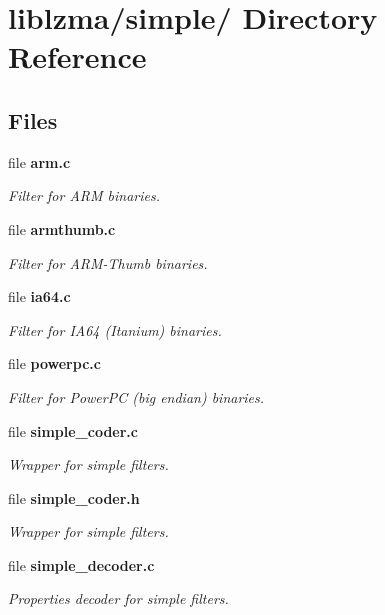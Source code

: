 \section{liblzma/simple/ Directory Reference}
\label{dir_458323780241bdde152c345212bdceaa}
\subsection*{Files}
\begin{DoxyCompactItemize}
\item 
file {\bf arm.\-c}
\begin{DoxyCompactList}\small\item\em Filter for A\-R\-M binaries. \end{DoxyCompactList}\item 
file {\bf armthumb.\-c}
\begin{DoxyCompactList}\small\item\em Filter for A\-R\-M-\/\-Thumb binaries. \end{DoxyCompactList}\item 
file {\bf ia64.\-c}
\begin{DoxyCompactList}\small\item\em Filter for I\-A64 (Itanium) binaries. \end{DoxyCompactList}\item 
file {\bf powerpc.\-c}
\begin{DoxyCompactList}\small\item\em Filter for Power\-P\-C (big endian) binaries. \end{DoxyCompactList}\item 
file {\bf simple\-\_\-coder.\-c}
\begin{DoxyCompactList}\small\item\em Wrapper for simple filters. \end{DoxyCompactList}\item 
file {\bf simple\-\_\-coder.\-h}
\begin{DoxyCompactList}\small\item\em Wrapper for simple filters. \end{DoxyCompactList}\item 
file {\bf simple\-\_\-decoder.\-c}
\begin{DoxyCompactList}\small\item\em Properties decoder for simple filters. \end{DoxyCompactList}\item 

\end{DoxyCompactItemize}
